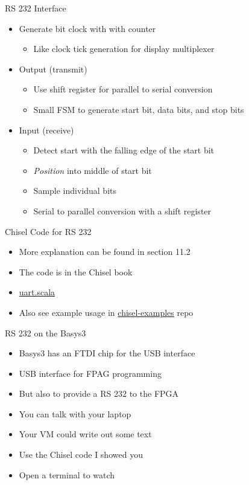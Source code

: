 \begin{frame}[fragile]{RS 232 Interface}
\begin{itemize}
\item Generate bit clock with with counter
\begin{itemize}
\item Like clock tick generation for display multiplexer
\end{itemize}
\item Output (transmit)
\begin{itemize}
\item Use shift register for parallel to serial conversion
\item Small FSM to generate start bit, data bits, and stop bits
\end{itemize}
\item Input (receive)
\begin{itemize}
\item Detect start with the falling edge of the start bit
\item \emph{Position} into middle of start bit
\item Sample individual bits
\item Serial to parallel conversion with a shift register
\end{itemize}
\end{itemize}
\end{frame}


\begin{frame}[fragile]{Chisel Code for RS 232}
\begin{itemize}
\item More explanation can be found in section 11.2
\item The code is in the Chisel book
\item \href{https://github.com/schoeberl/chisel-book/blob/master/src/main/scala/uart.scala}{uart.scala}
\item Also see example usage in \href{https://github.com/schoeberl/chisel-examples}{chisel-examples} repo
\end{itemize}
\end{frame}

\begin{frame}[fragile]{RS 232 on the Basys3}
\begin{itemize}
\item Basys3 has an FTDI chip for the USB interface
\item USB interface for FPAG programming
\item But also to provide a RS 232 to the FPGA
\item You can talk with your laptop
\item Your VM could write out some text
\item Use the Chisel code I showed you
\item Open a terminal to watch %
\end{itemize}
\end{frame}


